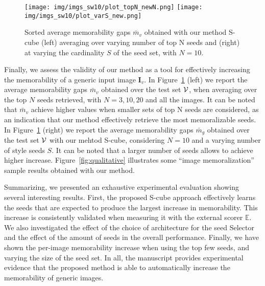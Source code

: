 \documentclass{sig-alternate-05-2015}
\begin{document}
\begin{figure}[t]
\hspace{-0.15cm}
\texttt{[image: img/imgs\_sw10/plot\_topN\_newN.png]}
\hspace{-0.2cm}
\texttt{[image: img/imgs\_sw10/plot\_varS\_new.png]}
\vspace{-0.3cm}
\caption{Sorted average memorability gaps $\bar{m}_v$ obtained with our method S-cube (left) averaging over varying number of top N seeds and (right) at varying the cardinality $S$ of the seed set, with $N=10$.}
\label{fig:delta_mem_stat1}
\vspace{-0.4cm}
\end{figure}


Finally, we assess the validity of our method as a tool for effectively increasing the memorability of a generic input image $\mathbf{I}_v$. 
In Figure~\ref{fig:delta_mem_stat1} (left) we report the average memorability gaps $\bar{m}_v$ obtained over the test set $\cal V$, when averaging over the top $N$ seeds retrieved, with $N=3,10,20$ and all the images. It can be noted that $\bar{m}_v$ achieve higher values when smaller sets of top N seeds are considered, as an indication that our method effectively retrieve the most memoralizable seeds. In Figure~\ref{fig:delta_mem_stat1} (right) we report the average memorability gaps $\bar{m}_g$ obtained over the test set $\cal V$ with our mehtod S-cube, considering $N=10$ and a varying number of style seeds $S$. It can be noted that a larger number of seeds allows to achieve higher increase.
Figure~\ref{fig:qualitative} illustrates some ``image memoralization'' sample results obtained with our method. %




Summarizing, we presented an exhaustive experimental evaluation showing several interesting results. First, the proposed S-cube approach effectively learns the seeds that are expected to produce the largest increase in memorability. This increase is consistently validated when measuring it with the external scorer $\mathbb{E}$. We also investigated the effect of the choice of architecture for the seed Selector and the effect of the amount of seeds in the overall performance. Finally, we have shown the per-image memorability increase when using the top few seeds, and varying the size of the seed set. In all, the manuscript provides experimental evidence that the proposed method is able to automatically increase the memorability of generic images.
\end{document}
